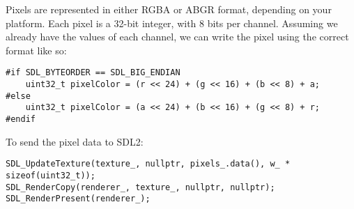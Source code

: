 \documentclass{scrartcl}
\begin{document}
Pixels are represented in either RGBA or ABGR format, depending on your platform.
Each pixel is a 32-bit integer, with 8 bits per channel.
Assuming we already have the values of each channel, we can write the pixel using the correct format like so:

\begin{verbatim}
#if SDL_BYTEORDER == SDL_BIG_ENDIAN
    uint32_t pixelColor = (r << 24) + (g << 16) + (b << 8) + a;
#else
    uint32_t pixelColor = (a << 24) + (b << 16) + (g << 8) + r;
#endif
\end{verbatim}

To send the pixel data to SDL2:

\begin{verbatim}
SDL_UpdateTexture(texture_, nullptr, pixels_.data(), w_ * sizeof(uint32_t));
SDL_RenderCopy(renderer_, texture_, nullptr, nullptr);
SDL_RenderPresent(renderer_);
\end{verbatim}
\end{document}
